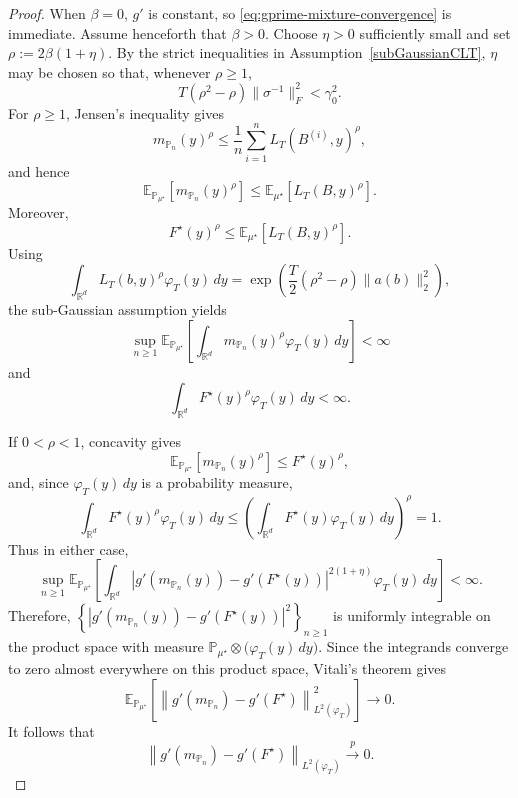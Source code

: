 \documentclass[11pt]{article}
\theoremstyle{definition}
\newcommand{\E}{\mathbb{E}}
\begin{document}
\begin{proof}
When $\beta=0$, $g'$ is constant, so
\eqref{eq:gprime-mixture-convergence} is immediate. Assume henceforth
that $\beta>0$. Choose $\eta>0$ sufficiently small and set $\rho:=2\beta(1+\eta).$
By the strict inequalities in
Assumption~\ref{subGaussianCLT}, $\eta$ may be chosen so that, whenever 
$\rho\geq1$,
\[
T(\rho^2-\rho)\|\sigma^{-1}\|_F^2
<
\gamma_0^2.
\]
For $\rho\geq1$, Jensen's inequality gives
\[
m_{\mathbb P_n}(y)^\rho
\leq
\frac1n
\sum_{i=1}^n
L_T(B^{(i)},y)^\rho,
\]
and hence
\[
\E_{\mathbb P_{\mu^\star}}
\left[
m_{\mathbb P_n}(y)^\rho
\right]
\leq
\E_{\mu^\star}
\left[
L_T(B,y)^\rho
\right].
\]
Moreover,
\[
F^\star(y)^\rho
\leq
\E_{\mu^\star}
\left[
L_T(B,y)^\rho
\right].
\]
Using
\[
\int_{\mathbb R^d}
L_T(b,y)^\rho
\varphi_T(y)\,dy
=
\exp\!\left(
\frac{T}{2}
(\rho^2-\rho)
\|a(b)\|_2^2
\right),
\]
the sub-Gaussian assumption yields
\[
\sup_{n\geq1}
\E_{\mathbb P_{\mu^\star}}
\left[
\int_{\mathbb R^d}
m_{\mathbb P_n}(y)^\rho
\varphi_T(y)\,dy
\right]
<\infty
\]
and
\[
\int_{\mathbb R^d}
F^\star(y)^\rho
\varphi_T(y)\,dy
<\infty.
\]

If $0<\rho<1$, concavity gives
\[
\E_{\mathbb P_{\mu^\star}}
\left[
m_{\mathbb P_n}(y)^\rho
\right]
\leq
F^\star(y)^\rho,
\]
and, since $\varphi_T(y)\,dy$ is a probability measure,
\[
\int_{\mathbb R^d}
F^\star(y)^\rho
\varphi_T(y)\,dy
\leq
\left(
\int_{\mathbb R^d}
F^\star(y)
\varphi_T(y)\,dy
\right)^\rho
=
1.
\]
Thus in either case,
\[
\sup_{n\geq1}
\E_{\mathbb P_{\mu^\star}}
\left[
\int_{\mathbb R^d}
\left|
g'\!\left(m_{\mathbb P_n}(y)\right)
-
g'\!\left(F^\star(y)\right)
\right|^{2(1+\eta)}
\varphi_T(y)\,dy
\right]
<\infty.
\]
Therefore, $\left\{
\left|
g'\!\left(m_{\mathbb P_n}(y)\right)
-
g'\!\left(F^\star(y)\right)
\right|^2
\right\}_{n\geq1}$
is uniformly integrable on the product space with measure $\mathbb P_{\mu^\star}
\otimes
\bigl(\varphi_T(y)\,dy\bigr).$
Since the integrands converge to zero almost everywhere on this product
space, Vitali's theorem gives
\[
\E_{\mathbb P_{\mu^\star}}
\left[
\left\|
g'\!\left(m_{\mathbb P_n}\right)
-
g'\!\left(F^\star\right)
\right\|_{L^2(\varphi_T)}^2
\right]
\longrightarrow0.
\]
It follows that
\[
\left\|
g'\!\left(m_{\mathbb P_n}\right)
-
g'\!\left(F^\star\right)
\right\|_{L^2(\varphi_T)}
\xrightarrow{p}0.
\]


\end{proof}
\end{document}
